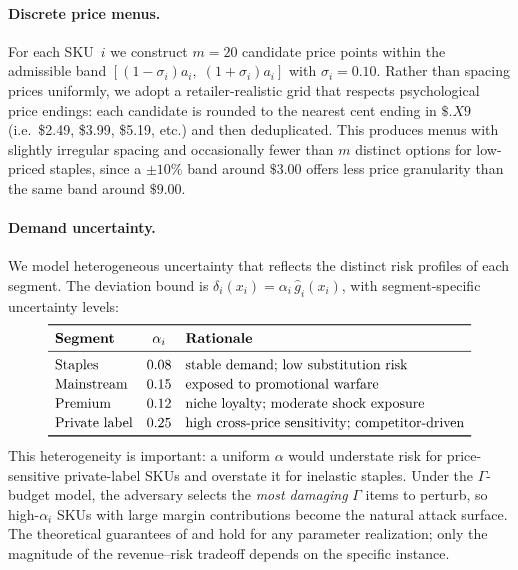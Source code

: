 \documentclass[11pt, a4paper]{article}
\theoremstyle{plain}
\theoremstyle{definition}
\theoremstyle{remark}
\begin{document}
\paragraph{Discrete price menus.}
For each SKU~$i$ we construct $m=20$ candidate price points within the admissible band
$[(1-\sigma_i)a_i,\;(1+\sigma_i)a_i]$ with $\sigma_i = 0.10$. Rather than spacing prices
uniformly, we adopt a retailer-realistic grid that respects psychological price endings:
each candidate is rounded to the nearest cent ending in $\$.X9$ (i.e.\ \$2.49, \$3.99,
\$5.19, etc.) and then deduplicated. This produces menus with slightly irregular spacing and
occasionally fewer than $m$ distinct options for low-priced staples, since a $\pm10\%$ band
around $\$3.00$ offers less price granularity than the same band around $\$9.00$.

\paragraph{Demand uncertainty.}
We model heterogeneous uncertainty that reflects the distinct risk profiles of each segment.
The deviation bound is $\delta_i(x_i) = \alpha_i\,\hat g_i(x_i)$, with segment-specific
uncertainty levels:
\[
\renewcommand{\arraystretch}{1.15}
\begin{array}{lcl}
\toprule
\textbf{Segment} & \alpha_i & \textbf{Rationale}\\
\midrule
\text{Staples} & 0.08
  & \text{stable demand; low substitution risk}\\
\text{Mainstream} & 0.15
  & \text{exposed to promotional warfare}\\
\text{Premium} & 0.12
  & \text{niche loyalty; moderate shock exposure}\\
\text{Private label} & 0.25
  & \text{high cross-price sensitivity; competitor-driven}\\
\bottomrule
\end{array}
\]
This heterogeneity is important: a uniform $\alpha$ would understate risk for
price-sensitive private-label SKUs and overstate it for inelastic staples. Under the
$\Gamma$-budget model, the adversary selects the \emph{most damaging} $\Gamma$ items to
perturb, so high-$\alpha_i$ SKUs with large margin contributions become the natural attack
surface. The theoretical guarantees of  and
 hold for any parameter realization; only the magnitude
of the revenue--risk tradeoff depends on the specific instance.

\end{document}
